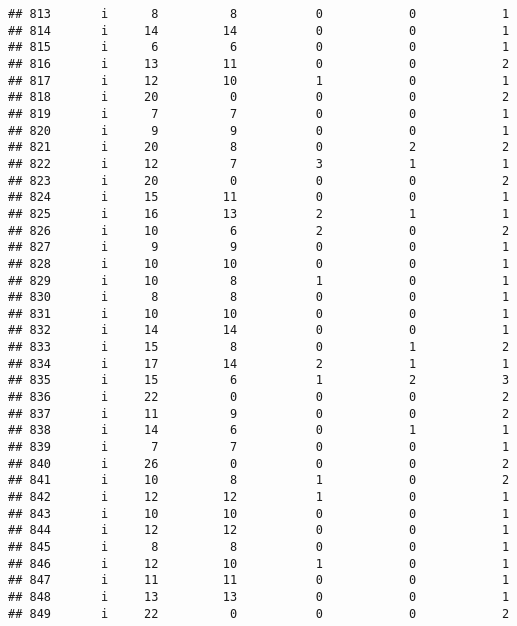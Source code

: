\documentclass[
]{article}
\begin{document}
\begin{verbatim}
## 813       i      8          8           0            0            1
## 814       i     14         14           0            0            1
## 815       i      6          6           0            0            1
## 816       i     13         11           0            0            2
## 817       i     12         10           1            0            1
## 818       i     20          0           0            0            2
## 819       i      7          7           0            0            1
## 820       i      9          9           0            0            1
## 821       i     20          8           0            2            2
## 822       i     12          7           3            1            1
## 823       i     20          0           0            0            2
## 824       i     15         11           0            0            1
## 825       i     16         13           2            1            1
## 826       i     10          6           2            0            2
## 827       i      9          9           0            0            1
## 828       i     10         10           0            0            1
## 829       i     10          8           1            0            1
## 830       i      8          8           0            0            1
## 831       i     10         10           0            0            1
## 832       i     14         14           0            0            1
## 833       i     15          8           0            1            2
## 834       i     17         14           2            1            1
## 835       i     15          6           1            2            3
## 836       i     22          0           0            0            2
## 837       i     11          9           0            0            2
## 838       i     14          6           0            1            1
## 839       i      7          7           0            0            1
## 840       i     26          0           0            0            2
## 841       i     10          8           1            0            2
## 842       i     12         12           1            0            1
## 843       i     10         10           0            0            1
## 844       i     12         12           0            0            1
## 845       i      8          8           0            0            1
## 846       i     12         10           1            0            1
## 847       i     11         11           0            0            1
## 848       i     13         13           0            0            1
## 849       i     22          0           0            0            2

\end{verbatim}
\end{document}

